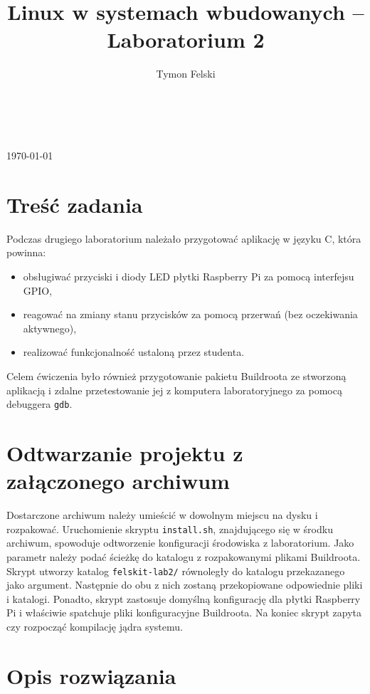 \documentclass[10pt,a4paper]{article}
\title{Linux w systemach wbudowanych -- Laboratorium 2}
\author{Tymon Felski}
\begin{document}
\makeatletter
\begin{center}
	\LARGE{\@title}\\
	\vspace{.4cm}
	\Large{\@author}\\
	\vspace{.2cm}
	\large{\today}
\end{center}
\makeatother

\section{Treść zadania}
Podczas drugiego laboratorium należało przygotować aplikację w języku C, która powinna:
\begin{itemize}
	\item obsługiwać przyciski i diody LED płytki Raspberry Pi za pomocą interfejsu GPIO,
	\item reagować na zmiany stanu przycisków za pomocą przerwań (bez oczekiwania aktywnego),
	\item realizować funkcjonalność ustaloną przez studenta.
\end{itemize}
Celem ćwiczenia było również przygotowanie pakietu Buildroota ze stworzoną aplikacją i zdalne przetestowanie jej z komputera laboratoryjnego za pomocą debuggera \texttt{gdb}.

\section{Odtwarzanie projektu z załączonego archiwum}
Dostarczone archiwum należy umieścić w dowolnym miejscu na dysku i rozpakować. Uruchomienie skryptu \texttt{install.sh}, znajdującego się w środku archiwum, spowoduje odtworzenie konfiguracji środowiska z laboratorium. Jako parametr należy podać ścieżkę do katalogu z rozpakowanymi plikami Buildroota.\\[\baselineskip]
Skrypt utworzy katalog \texttt{felskit-lab2/} równoległy do katalogu przekazanego jako argument. Następnie do obu z nich zostaną przekopiowane odpowiednie pliki i katalogi. Ponadto, skrypt zastosuje domyślną konfigurację dla płytki Raspberry Pi i właściwie spatchuje pliki konfiguracyjne Buildroota. Na koniec skrypt zapyta czy rozpocząć kompilację jądra systemu.

\section{Opis rozwiązania}
\end{document}
